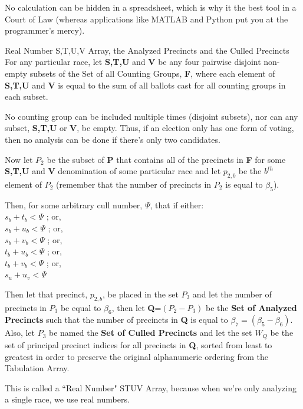 No calculation can be hidden in a spreadsheet, which is why it the best tool in a Court of Law (whereas applications like MATLAB and Python put you at the programmer's mercy).
\newpage
\begin{definition}{Real Number S,T,U,V Array, the Analyzed Precincts and the Culled Precincts}\\
For any particular race, let \textbf{S,T,U} and \textbf{V} be any four pairwise disjoint non-empty subsets of the Set of all Counting Groups, \textbf{F}, where each element of \textbf{S,T,U} and \textbf{V} is equal to the sum of all ballots cast for all counting groups in each subset.

No counting group can be included multiple times (disjoint subsets), nor can any subset, \textbf{S,T,U} or \textbf{V}, be empty. Thus, if an election only has one form of voting, then no analysis can be done if there's only two candidates.

Now let $P_{2}$ be the subset of \textbf{P} that contains all of the precincts in \textbf{F} for some \textbf{S,T,U} and \textbf{V} denomination of some particular race and let $p_{2,b}$ be the $b^{th}$ element of $P_{2}$ (remember that the number of precincts in $P_{2}$ is equal to $\beta_{5}$).

Then, for some arbitrary cull number, $\Psi$, that if either:\\
$s_{b}+t_{b}<\Psi$ ; or,\\
$s_{b}+u_{b}<\Psi$ ; or,\\
$s_{b}+v_{b}<\Psi$ ; or,\\
$t_{b}+u_{b}<\Psi$ ; or,\\
$t_{b}+v_{b}<\Psi$ ; or,\\
$s_{u}+u_{v}<\Psi$

Then let that precinct, $p_{2,b}$, be placed in the set $P_{3}$ and let the number of precincts in $P_{3}$ be equal to $\beta_{6}$, then let \textbf{Q}=$(P_{2}-P_{3})$ be the \textbf{Set of Analyzed Precincts} such that the number of precincts in \textbf{Q} is equal to $\beta_{7}=(\beta_{5}-\beta_{6})$. Also, let $P_{3}$ be named the \textbf{Set of Culled Precincts} and let the set $W_{Q}$ be the set of principal precinct indices for all precincts in \textbf{Q}, sorted from least to greatest in order to preserve the original alphanumeric ordering from the Tabulation Array.
\end{definition}

This is called a ``Real Number" STUV Array, because when we're only analyzing a single race, we use real numbers.

